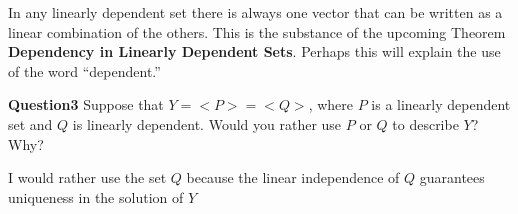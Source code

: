 \documentclass{article}
\begin{document}
\bigskip

\sol

In any linearly dependent set there is always one vector that can be written as a linear combination of the others.
This is the substance of the upcoming Theorem \textbf{Dependency in Linearly Dependent Sets}.
Perhaps this will explain the use of the word “dependent.”

\bigskip
\bigskip

\noindent\textbf{Question3} Suppose that \(Y=<P>=<Q>\), where \(P\) is a linearly dependent set and \(Q\) is linearly dependent.
Would you rather use \(P\) or \(Q\) to describe \(Y\)? Why?

\bigskip

\sol

I would rather use the set \(Q\) because the linear independence of \(Q\) guarantees uniqueness in the solution of \(Y\)
\end{document}
